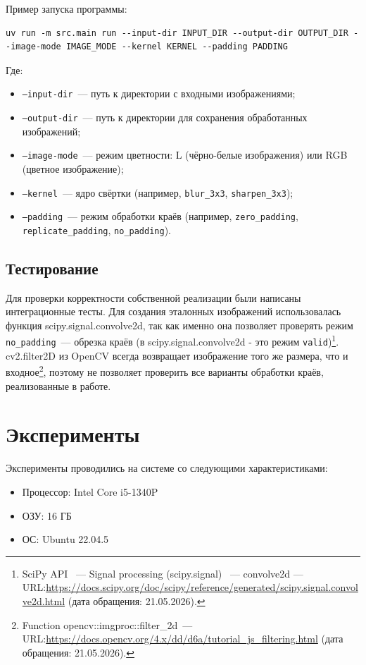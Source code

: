 \documentclass[a4paper]{article}
\begin{document}
Пример запуска программы:
\begin{verbatim}
uv run -m src.main run --input-dir INPUT_DIR --output-dir OUTPUT_DIR --image-mode IMAGE_MODE --kernel KERNEL --padding PADDING
\end{verbatim}

Где:
\begin{itemize}
    \item \texttt{--input-dir}~--- путь к директории с входными изображениями;
    \item \texttt{--output-dir}~--- путь к директории для сохранения обработанных изображений;
    \item \texttt{--image-mode}~--- режим цветности: L (чёрно-белые изображения) или RGB (цветное изображение);
    \item \texttt{--kernel}~--- ядро свёртки (например, \texttt{blur\_3x3}, \texttt{sharpen\_3x3});
    \item \texttt{--padding}~--- режим обработки краёв (например, \texttt{zero\_padding}, \texttt{replicate\_padding}, \texttt{no\_padding}).
\end{itemize}

\subsection{Тестирование}

Для проверки корректности собственной реализации были написаны интеграционные тесты. Для создания эталонных изображений использовалась функция scipy.signal.convolve2d, так как именно она позволяет проверять режим \texttt{no\_padding}~--- обрезка краёв (в scipy.signal.convolve2d - это режим \texttt{valid})\footnote{SciPy API ~--- Signal processing (scipy.signal) ~--- convolve2d --- URL:\url{https://docs.scipy.org/doc/scipy/reference/generated/scipy.signal.convolve2d.html} (дата обращения: 21.05.2026).}. 
cv2.filter2D из OpenCV всегда возвращает изображение того же размера, что и входное\footnote{Function opencv::imgproc::filter\_2d~--- URL:\url{https://docs.opencv.org/4.x/dd/d6a/tutorial_js_filtering.html} (дата обращения: 21.05.2026).}, поэтому не позволяет проверить все варианты обработки краёв, реализованные в работе.

\section{Эксперименты}

Эксперименты проводились на системе со следующими характеристиками:
\begin{itemize}
    \item Процессор: Intel Core i5-1340P
    \item ОЗУ: 16 ГБ
    \item ОС: Ubuntu 22.04.5
\end{itemize}
\end{document}

